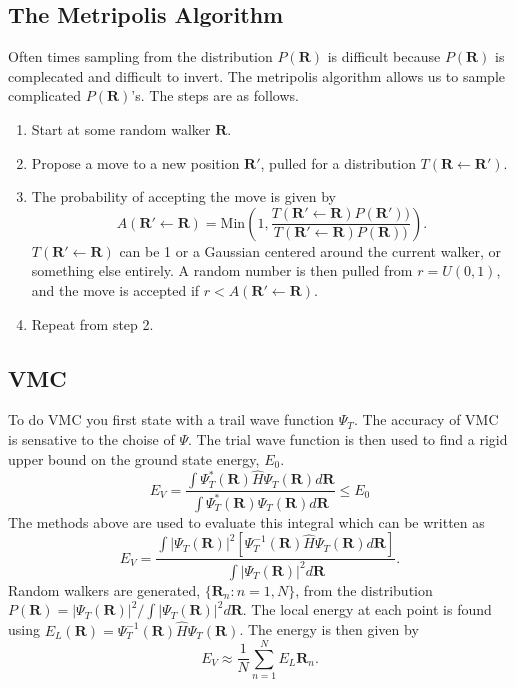 \subsection*{The Metripolis Algorithm}
Often times sampling from the distribution $P(\mathbf{R})$ is difficult because $P(\mathbf{R})$ is complecated and difficult to invert. The metripolis algorithm allows us to sample complicated $P(\mathbf{R})$'s. The steps are as follows.
\begin{enumerate}
  \item Start at some random walker $\mathbf{R}$.
  \item Propose a move to a new position $\mathbf{R}'$, pulled for a distribution $T(\mathbf{R \leftarrow R'})$.
  \item The probability of accepting the move is given by
    \begin{equation}
      A(\mathbf{R' \leftarrow R}) = \mathrm{Min}\left( 1, \frac{T(\mathbf{R' \leftarrow R}) P(\mathbf{R}'))}{T(\mathbf{R' \leftarrow R}) P(\mathbf{R}))} \right).
    \end{equation}
    $T(\mathbf{R' \leftarrow R})$ can be 1 or a Gaussian centered around the current walker, or something else entirely. A random number is then pulled from $r=U(0,1)$, and the move is accepted if $r<A(\mathbf{R' \leftarrow R})$.
  \item Repeat from step 2.
\end{enumerate}

\subsection*{VMC}
To do VMC you first state with a trail wave function $\Psi_T$. The accuracy of VMC is sensative to the choise of $\Psi$. The trial wave function is then used to find a rigid upper bound on the ground state energy, $E_0$.
\begin{equation}
  E_V = \frac{\int \Psi_T^*(\mathbf{R})\hat{H}\Psi_T(\mathbf{R})d\mathbf{R}}{\int \Psi_T^*(\mathbf{R})\Psi_T(\mathbf{R})d\mathbf{R}} \le E_0
\end{equation}
The methods above are used to evaluate this integral which can be written as
\begin{equation}
  E_V = \frac{\int |\Psi_T(\mathbf{R})|^2 [\Psi_T^{-1}(\mathbf{R})\hat{H}\Psi_T(\mathbf{R})d\mathbf{R}]}{\int |\Psi_T(\mathbf{R})|^2 d\mathbf{R}}.
\end{equation}
Random walkers are generated, $\{\mathbf{R}_n: n=1,N\}$, from the distribution $P(\mathbf{R}) = |\Psi_T(\mathbf{R})|^2/\int|\Psi_T(\mathbf{R})|^2d\mathbf{R}$. The local energy at each point is found using $E_L(\mathbf{R}) = \Psi_T^{-1}(\mathbf{R}) \hat{H} \Psi_T(\mathbf{R})$. The energy is then given by
\begin{equation}
  E_V \approx \frac{1}{N} \sum\limits_{n=1}^N E_L{\mathbf{R}_n}.
\end{equation}
